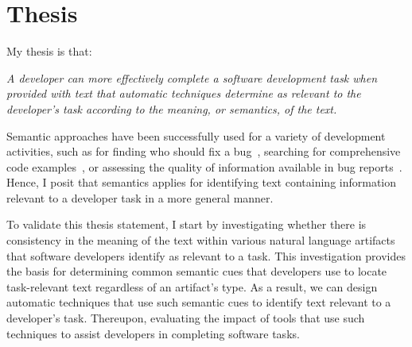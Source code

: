 

\section{Thesis}
\label{cp1:thesis}




My thesis is that:


\medskip
\begin{bluequote}
    \textit{
        A developer can more effectively complete a software development task when provided
        with text that automatic techniques determine as relevant to the developer's task
        according to the meaning, or semantics, of the text.
    }
\end{bluequote}



\smallskip
Semantic approaches have been successfully used for a variety of development activities, such as
for finding who should fix a bug~\cite{yang2016}, searching for comprehensive code examples~\cite{silva2019},
or assessing the quality of information available in bug reports~\cite{chaparro2019}. 
Hence, I posit that semantics applies for identifying text containing information
relevant to a developer task in a more general manner. 





To validate this thesis statement, I start by investigating whether there is consistency in the meaning of the text within various natural language artifacts that software developers identify as relevant to a task.
This investigation provides the basis for determining common semantic cues that developers use to locate task-relevant text regardless of an artifact's type. 
As a result, we can design automatic techniques that use such semantic cues to identify text relevant to a developer's task.
Thereupon, evaluating the impact of tools that use such techniques to assist developers in completing software tasks.




